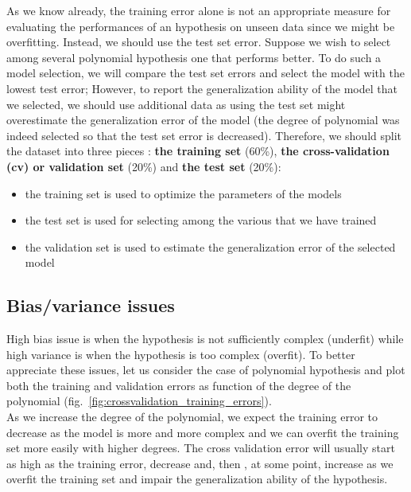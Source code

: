 \documentclass[10pt,a4paper]{article}
\begin{document}
As we know already, the training error alone is not an appropriate measure for evaluating the performances of an hypothesis on unseen data since we might be overfitting. Instead, we should use the test set error. Suppose we wish to select among several polynomial hypothesis one that performs better. To do such a model selection, we will compare the test set errors and select the model with the lowest test error; However, to report the generalization ability of the model that we selected, we should use additional data as using the test set might overestimate the generalization error of the model (the degree of polynomial was indeed selected so that the test set error is decreased). Therefore, we should split the dataset into three pieces : \textbf{the training set} (60\%), \textbf{the cross-validation (cv) or validation set} (20\%) and \textbf{the test set} (20\%):
\begin{itemize}
\item the training set is used to optimize the parameters of the models
\item the test set is used for selecting among the various that we have trained
\item the validation set is used to estimate the generalization error of the selected model
\end{itemize}

\subsection{Bias/variance issues}

High bias issue is when the hypothesis is not sufficiently complex (underfit) while high variance is when the hypothesis is too complex (overfit). To better appreciate these issues, let us consider the case of polynomial hypothesis and plot both the training and validation errors as function of the degree of the polynomial (fig.~\ref{fig:crossvalidation_training_errors}). \\

As we increase the degree of the polynomial, we expect the training error to decrease as the model is more and more complex and we can overfit the training set more easily with higher degrees. The cross validation error will usually start as high as the training error, decrease and, then , at some point, increase as we overfit the training set and impair the generalization ability of the hypothesis.\\
\end{document}

